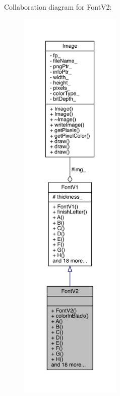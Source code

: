Collaboration diagram for Font\+V2\+:\nopagebreak
\begin{figure}[H]
\begin{center}
\leavevmode
\includegraphics[height=550pt]{class_font_v2__coll__graph}
\end{center}
\end{figure}
